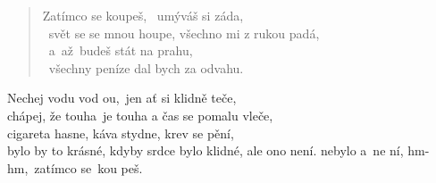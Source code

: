 \begin{song}{}
\begin{verse}
  Zatímco se koupeš, ~umýváš si záda, \\
  ~svět se se mnou houpe, všechno mi z rukou padá, \\
  ~a~až~budeš stát na prahu, \\
  ~všechny peníze dal bych za odvahu.
\end{verse}
\begin{refren}
   Nechej vodu vod ou,~jen ať si klidně teče, \\
   chápej, že touha~je touha a čas se pomalu vleče, \\
   cigareta hasne, káva stydne, krev se pění, \\
   bylo by to krásné, kdyby srdce bylo klidné, ale ono není.
   nebylo a~ne ní, hm-hm,~zatímco se~kou peš.
\end{refren}
  \begin{chords}
    \chordHm
  \end{chords}
\end{song}
\pagebreak
